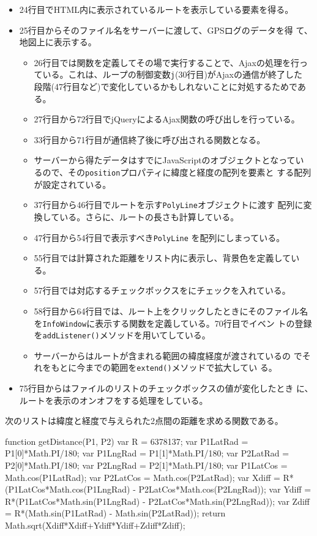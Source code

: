 \begin{itemize}
 \item 24行目でHTML内に表示されているルートを表示している要素を得る。
 \item 25行目からそのファイル名をサーバーに渡して、GPSログのデータを得
       て、地図上に表示する。
\begin{itemize}
 \item 26行目では関数を定義してその場で実行することで、Ajaxの処理を行っ
       ている。これは、ループの制御変数\texttt{j}(30行目)がAjaxの通信が終了した
       段階(47行目など)で変化しているかもしれないことに対処するためである。
 \item 27行目から72行目でjQueryによるAjax関数の呼び出しを行っている。
 \item 33行目から71行目が通信終了後に呼び出される関数となる。
 \item サーバーから得たデータはすでにJavaScriptのオブジェクトとなってい
       るので、その\texttt{position}プロパティに緯度と経度の配列を要素と
       する配列が設定されている。
 \item 37行目から46行目でルートを示す\texttt{PolyLine}オブジェクトに渡す
       配列に変換している。さらに、ルートの長さも計算している。
 \item 47行目から54行目で表示すべき\texttt{PolyLine}
       を配列にしまっている。
 \item 55行目では計算された距離をリスト内に表示し、背景色を定義している。
 \item 57行目では対応するチェックボックスをにチェックを入れている。
 \item 58行目から64行目では、ルート上をクリックしたときにそのファイル名
       を\texttt{InfoWindow}に表示する関数を定義している。70行目でイベン
       トの登録を\texttt{addListener()}メソッドを用いてしている。
 \item サーバーからはルートが含まれる範囲の緯度経度が渡されているの
       でそれをもとに今までの範囲を\texttt{extend()}メソッドで拡大してい
       る。
\end{itemize}
 \item 75行目からはファイルのリストのチェックボックスの値が変化したとき
       に、ルートを表示のオンオフをする処理をしている。
\end{itemize}
次のリストは緯度と経度で与えられた2点間の距離を求める関数である。
\begin{listingcont}
function getDistance(P1, P2) {
    var R = 6378137;
    var P1LatRad = P1[0]*Math.PI/180;
    var P1LngRad = P1[1]*Math.PI/180;
    var P2LatRad = P2[0]*Math.PI/180;
    var P2LngRad = P2[1]*Math.PI/180;
    var P1LatCos = Math.cos(P1LatRad);
    var P2LatCos = Math.cos(P2LatRad);
    var Xdiff = R*(P1LatCos*Math.cos(P1LngRad) - P2LatCos*Math.cos(P2LngRad));
    var Ydiff = R*(P1LatCos*Math.sin(P1LngRad) - P2LatCos*Math.sin(P2LngRad));
    var Zdiff = R*(Math.sin(P1LatRad) - Math.sin(P2LatRad));
    return Math.sqrt(Xdiff*Xdiff+Ydiff*Ydiff+Zdiff*Zdiff);
}
\end{listingcont}
